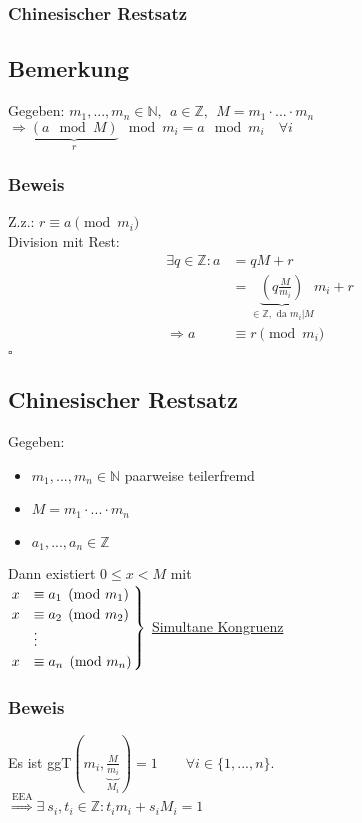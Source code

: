 \documentclass[12pt,titlepage, pdf]{article}
\newcommand{\uline}[1]{\underline{#1}}
\newcommand{\qed}{\hfill$\square$}
\renewcommand{\>}{\rightarrow}
\renewcommand{\*}{\cdot}
\renewenvironment{rcases}{%
	\left.\renewcommand*\lbrace.%
	\begin{cases}}%
	{\end{cases}\right\rbrace}
\begin{document}
	\subsubsection*{Chinesischer Restsatz}
	\subsection{Bemerkung}
	\label{4.10}
	Gegeben: $m_1,...,m_n \in \mathds{N},~~ a \in \mathds{Z},~~ M = m_1 \cdot ... \cdot m_n$ \\
	\noindent\hspace*{11mm}$\Rightarrow\underbrace{(a \mod M)}_{r} \mod m_i = a \mod m_i \quad\forall i$
	\subsubsection*{Beweis}
	Z.z.: $r \equiv a \pmod {m_i}$\\
	Division mit Rest: 
	\begin{align*}
	\exists q \in \mathds{Z}: a &= qM + r \\
	&= \underbrace{(q \frac{M}{m_i})}_{\in \mathds{Z}, \text{ da } m_i \vert M} m_i + r \\
	\Rightarrow a &\equiv r \pmod{m_i} \\
	\end{align*}
	\qed
	\subsection{Chinesischer Restsatz}
	\label{4.11}
	Gegeben:
	\begin{itemize}
		\item $m_1,...,m_n \in \mathds{N}$ paarweise teilerfremd
		\item $M = m_1 \cdot ... \cdot m_n$
		\item $a_1,...,a_n \in \mathds{Z}$
	\end{itemize}
	Dann existiert $0 \leq x < M$ mit \\
	
	$\begin{rcases}
	x &\equiv a_1 \pmod{m_1} \\
	x &\equiv a_2 \pmod{m_2} \\
	&\vdots \\
	x &\equiv a_n \pmod{m_n} \\
	\end{rcases}$ \uline{Simultane Kongruenz} 
	
	\subsubsection*{Beweis}
	Es ist ggT$(m_i, \underbrace{\frac{M}{m_i}}_{M_i}) = 1 \qquad \forall i \in \{1,...,n\}$. \\
	$\overset{\text{EEA}}{\Rightarrow } \exists~ s_i, t_i \in \mathds{Z}: t_i m_i + s_i M_i = 1$ \\
	
\end{document}
